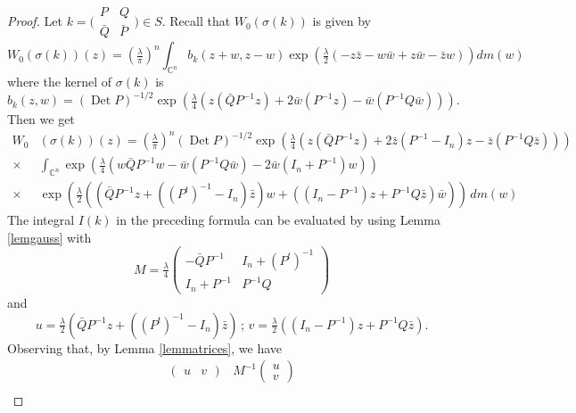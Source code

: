 \documentclass[12pt]{amsart}
\numberwithin{equation}{section}
\DeclareMathOperator{\Det}{Det} \DeclareMathOperator{\Tr}{Tr}
\begin{document}
\begin{proof} Let $k=\bigl(\begin{smallmatrix} P&Q\\
{\bar Q}&{\bar P} \end{smallmatrix}\bigr)\in S$. Recall that $W_0(\sigma(k))$ is given by
\begin{equation*}W_0(\sigma(k))(z)=\left(\tfrac{\lambda}{\pi}\right)^n\int_{{\mathbb C}^n}b_k(z+w,z-w)\exp \left(\tfrac{\lambda}{2}\left(-z{\bar z}-w{\bar w}+z{\bar w}-{\bar z}w\right)\right) dm(w)\end{equation*}
where the kernel of $\sigma(k)$ is
\begin{equation*}b_k(z,w)=(\Det P)^{-1/2}\exp \left(\tfrac{\lambda}{4}\left(
z({\bar Q}P^{-1}z)+2{\bar w}(P^{-1}z)-{\bar w}(P^{-1}Q{\bar w})\right)\right).
\end{equation*}
Then we get
\begin{align*}W_0&(\sigma(k))(z)=\left(\tfrac{\lambda}{\pi}\right)^n
(\Det P)^{-1/2}\exp \left(\tfrac{\lambda}{4}\left(
z({\bar Q}P^{-1}z)+2{\bar z}(P^{-1}-I_n)z-{\bar z}(P^{-1}Q{\bar z})\right)\right)\\
\times & \int_{{\mathbb C}^n}\exp \left(\tfrac{\lambda}{4}\left(w{\bar Q}P^{-1}w-{\bar w}(P^{-1}Q{\bar w})-2{\bar w}(I_n+P^{-1})w\right)\right) \\
\times & \exp \left(\tfrac{\lambda}{2}\left(({\bar Q}P^{-1}z+((P^t)^{-1}-I_n){\bar z})w+
((I_n-P^{-1})z+P^{-1}Q{\bar z}){\bar w}\right)\right) \,dm(w)
\end{align*}
The integral $I(k)$ in the preceding formula can be evaluated by using Lemma \ref{lemgauss}
with \begin{equation*}M=\tfrac{\lambda}{4}\begin{pmatrix}-{\bar Q}P^{-1} &I_n+(P^t)^{-1}\\I_n+P^{-1}&P^{-1}Q \end{pmatrix}\end{equation*} and
\begin{equation*}u=\tfrac{\lambda}{2}({\bar Q}P^{-1}z+((P^t)^{-1}-I_n){\bar z})\,;\,v=\tfrac{\lambda}{2}((I_n-P^{-1})z+P^{-1}Q{\bar z}).\end{equation*}
Observing that, by Lemma \ref{lemmatrices}, we have
\begin{align*}
\begin{pmatrix}u&v\end{pmatrix}&M^{-1}\begin{pmatrix}u\\v\end{pmatrix}\\

\end{align*}
\end{proof}
\end{document}
